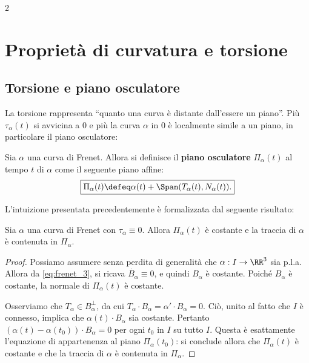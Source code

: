 \begin{multicols*}{2}
    \section{Proprietà di curvatura e torsione}

    \subsection{Torsione e piano osculatore}

    La torsione rappresenta ``quanto una curva è distante dall'essere un piano''.
    Più $\tau_\alpha(t)$ si avvicina a $0$ e più la curva $\alpha$ in $0$ è
    localmente simile a un piano, in particolare il piano osculatore:

    \begin{definition}
        Sia $\alpha$ una curva di Frenet. Allora si definisce
        il \textbf{piano osculatore} $\Pi_\alpha(t)$ al tempo $t$ di
        $\alpha$ come il seguente piano affine:
        \[ \boxed{\Pi_\alpha(t) \defeq \alpha(t) + \Span(T_\alpha(t), N_\alpha(t)).} \]
    \end{definition}

    L'intuizione presentata precedentemente è formalizzata dal seguente risultato:

    \begin{proposition}
        Sia $\alpha$ una curva di Frenet con $\tau_\alpha \equiv 0$. Allora
        $\Pi_\alpha(t)$ è costante e la traccia di $\alpha$ è contenuta in
        $\Pi_\alpha$.
    \end{proposition}

    \begin{proof}
        Possiamo assumere senza perdita di generalità che $\alpha : I \to \RR^3$ sia p.l.a.
        Allora da \eqref{eq:frenet_3}, si ricava $\dot{B_\alpha} \equiv 0$,
        e quindi $B_\alpha$ è costante. Poiché $B_\alpha$ è costante, la normale
        di $\Pi_\alpha(t)$ è costante. \smallskip

        Osserviamo che $T_\alpha \in B_\alpha^\perp$,
        da cui $T_\alpha \cdot B_\alpha = \alpha' \cdot B_\alpha = 0$. Ciò, unito al fatto
        che $I$ è connesso, implica che $\alpha(t) \cdot B_\alpha$ sia costante. Pertanto
        $(\alpha(t) - \alpha(t_0)) \cdot B_\alpha = 0$ per ogni $t_0$ in $I$ su tutto $I$.
        Questa è esattamente l'equazione di appartenenza al piano $\Pi_\alpha(t_0)$: si conclude
        allora che $\Pi_\alpha(t)$ è costante e che la traccia di $\alpha$ è contenuta in
        $\Pi_\alpha$.
    \end{proof}


\end{multicols*}

